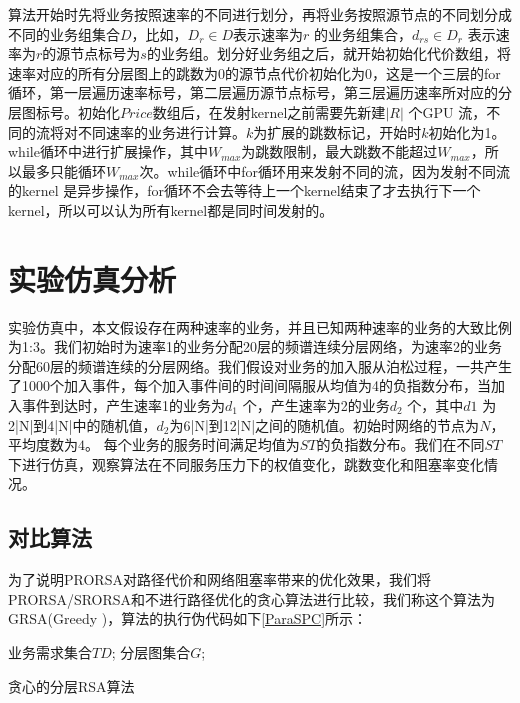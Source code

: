 算法开始时先将业务按照速率的不同进行划分，再将业务按照源节点的不同划分成不同的业务组集合$D$，比如，$D_r \in D$表示速率为$r$ 的业务组集合，$d_{rs} \in D_r$ 表示速率为$r$的源节点标号为$s$的业务组。划分好业务组之后，就开始初始化代价数组，将速率对应的所有分层图上的跳数为0的源节点代价初始化为0，这是一个三层的for循环，第一层遍历速率标号，第二层遍历源节点标号，第三层遍历速率所对应的分层图标号。初始化$Price$数组后，在发射kernel之前需要先新建$|R|$ 个GPU 流，不同的流将对不同速率的业务进行计算。$k$为扩展的跳数标记，开始时$k$初始化为1。while循环中进行扩展操作，其中$W_{max}$为跳数限制，最大跳数不能超过$W_{max}$，所以最多只能循环$W_{max}$次。while循环中for循环用来发射不同的流，因为发射不同流的kernel 是异步操作，for循环不会去等待上一个kernel结束了才去执行下一个kernel，所以可以认为所有kernel都是同时间发射的。
\section{实验仿真分析}

实验仿真中，本文假设存在两种速率的业务，并且已知两种速率的业务的大致比例为1:3。我们初始时为速率1的业务分配20层的频谱连续分层网络，为速率2的业务分配60层的频谱连续的分层网络。我们假设对业务的加入服从泊松过程，一共产生了1000个加入事件，每个加入事件间的时间间隔服从均值为4的负指数分布，当加入事件到达时，产生速率1的业务为$d_1$ 个，产生速率为2的业务$d_2$ 个，其中$d1$ 为2|N|到4|N|中的随机值，$d_2$为6|N|到12|N|之间的随机值。初始时网络的节点为$N$，平均度数为$4$。 每个业务的服务时间满足均值为$ST$的负指数分布。我们在不同$ST$下进行仿真，观察算法在不同服务压力下的权值变化，跳数变化和阻塞率变化情况。
\subsection{对比算法}

为了说明PRORSA对路径代价和网络阻塞率带来的优化效果，我们将PRORSA/SRORSA和不进行路径优化的贪心算法进行比较，我们称这个算法为GRSA(Greedy )，算法的执行伪代码如下\ref{ParaSPC}所示：
\begin{algorithm}[t]
\begin{algorithmic}[1]
\Require
业务需求集合$TD$;
分层图集合$G$;
\EndIf
\EndFor
{}
\EndIf
\EndFor
\EndFor
\EndFor
\end{algorithmic}
\caption{{贪心的分层RSA算法}}
\label{ParaSPC}
\end{algorithm}

